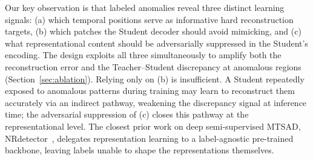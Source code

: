 Our key observation is that labeled anomalies reveal three distinct learning signals: (a) which temporal positions serve as informative hard reconstruction targets, (b) which patches the Student decoder should avoid mimicking, and (c) what representational content should be adversarially suppressed in the Student's encoding.
The design exploits all three simultaneously to amplify both the reconstruction error and the Teacher--Student discrepancy at anomalous regions (Section~\ref{sec:ablation}).
Relying only on (b) is insufficient.
A Student repeatedly exposed to anomalous patterns during training may learn to reconstruct them accurately via an indirect pathway, weakening the discrepancy signal at inference time; the adversarial suppression of (c) closes this pathway at the representational level.
The closest prior work on deep semi-supervised MTSAD, NRdetector~\cite{wang2025nrdetector}, delegates representation learning to a label-agnostic pre-trained backbone, leaving labels unable to shape the representations themselves.


